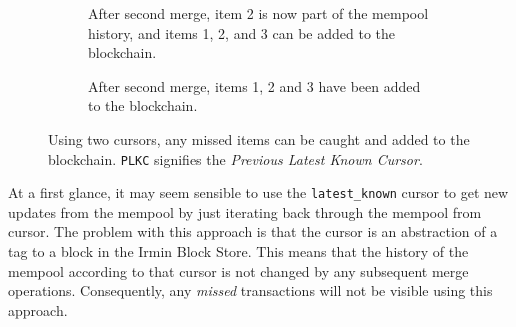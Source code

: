 \documentclass[12pt,a4paper,twoside,openright]{report}
\begin{document}
\begin{figure}
\begin{subfigure}[b]{0.45\textwidth}
				\caption{After second merge, item 2 is now part of the mempool history, and items 1, 2, and 3 can be added to the blockchain.}
			\end{subfigure}
			\begin{subfigure}[b]{0.45\textwidth}
				\centering
				\caption{After second merge, items 1, 2 and 3 have been added to the blockchain.}
			\end{subfigure}
			\caption{Using two cursors, any missed items can be caught and added to the blockchain. \texttt{PLKC} signifies the \textit{Previous Latest Known Cursor}.}	
			\label{fig:readremotepartudpatesfixed}
		\end{figure}

		At a first glance, it may seem sensible to use the \texttt{latest\_known} cursor to get new updates from the mempool by just iterating back through the mempool from cursor.
		The problem with this approach is that the cursor is an abstraction of a tag to a block in the Irmin Block Store.
		This means that the history of the mempool according to that cursor is not changed by any subsequent merge operations.
		Consequently, any \textit{missed} transactions will not be visible using this approach.\\
\end{document}
